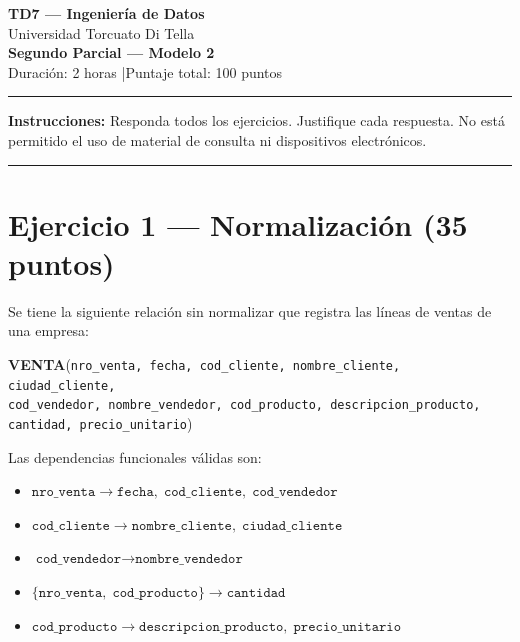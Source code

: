 \documentclass[11pt,a4paper]{article}
\begin{document}
\begin{center}
  {\LARGE\bfseries TD7 — Ingeniería de Datos}\\[6pt]
  {\large Universidad Torcuato Di Tella}\\[4pt]
  {\Large\bfseries Segundo Parcial — Modelo 2}\\[4pt]
  {\normalsize Duración: 2 horas \quad|\quad Puntaje total: 100 puntos}
\end{center}
\noindent\rule{\linewidth}{0.8pt}
\vspace{2pt}

\noindent\textbf{Instrucciones:} Responda todos los ejercicios. Justifique cada respuesta. No está permitido el uso de material de consulta ni dispositivos electrónicos.

\vspace{6pt}
\noindent\rule{\linewidth}{0.4pt}

\section*{Ejercicio 1 — Normalización \hfill\normalfont(35 puntos)}

Se tiene la siguiente relación sin normalizar que registra las líneas de ventas de una empresa:

\begin{center}
\textbf{VENTA}(\texttt{nro\_venta, fecha, cod\_cliente, nombre\_cliente, ciudad\_cliente,}\\
\texttt{cod\_vendedor, nombre\_vendedor, cod\_producto, descripcion\_producto,}\\
\texttt{cantidad, precio\_unitario})
\end{center}

Las dependencias funcionales válidas son:

\begin{itemize}
  \item $\texttt{nro\_venta} \rightarrow \texttt{fecha},\; \texttt{cod\_cliente},\; \texttt{cod\_vendedor}$
  \item $\texttt{cod\_cliente} \rightarrow \texttt{nombre\_cliente},\; \texttt{ciudad\_cliente}$
  \item $\texttt{cod\_vendedor} \rightarrow \texttt{nombre\_vendedor}$
  \item $\{\texttt{nro\_venta},\; \texttt{cod\_producto}\} \rightarrow \texttt{cantidad}$
  \item $\texttt{cod\_producto} \rightarrow \texttt{descripcion\_producto},\; \texttt{precio\_unitario}$
\end{itemize}
\end{document}
